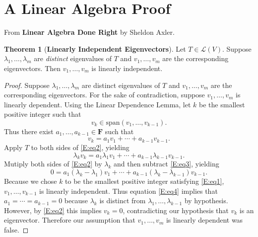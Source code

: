 \documentclass[12pt]{article}
\theoremstyle{definition}
\newtheorem{theorem}{Theorem}[section]
\begin{document}
\section{A Linear Algebra Proof}
From \textbf{Linear Algebra Done Right} by Sheldon Axler.
\begin{theorem}[\textbf{Linearly Independent Eigenvectors}]
Let $T \in \mathcal{L}(V)$.  Suppose $\lambda_{1},\ldots ,\lambda_{m}$ are \textit{distinct} eigenvalues of $T$ and $v_{1},\ldots ,v_{m}$ are the corresponding eigenvectors.  Then $v_{1},\ldots ,v_{m}$ is linearly independent.
\end{theorem}
\begin{proof}
Suppose $\lambda_{1},\ldots ,\lambda_{m}$ are distinct eigenvalues of $T$ and $v_{1},\ldots ,v_{m}$ are the corresponding eigenvectors.  For the sake of contradiction, suppose $v_{1},\ldots ,v_{m}$ is linearly dependent.  Using the Linear Dependence Lemma, let $k$ be the smallest positive integer such that 
\setcounter{equation}{0}%
\begin{equation}%
v_{k} \in \text{span}\left( v_{1},\ldots ,v_{k-1} \right).\label{E:eq1}%
\end{equation}
Thus there exist $a_{1},\ldots ,a_{k-1} \in \boldsymbol{F}$ such that
\begin{equation}
v_{k} = a_{1}v_{1}+ \cdots + a_{k-1}v_{k-1}. \label{E:eq2}%
\end{equation}
Apply $T$ to both sides of \eqref{E:eq2}, yielding
\begin{equation}
\lambda_{k}v_{k}= a_{1}\lambda_{1}v_{1}+ \cdots + a_{k-1}\lambda_{k-1}v_{k-1}.\label{E:eq3}
\end{equation}
Mutiply both sides of \eqref{E:eq2} by $\lambda_{k}$ and then subtract \eqref{E:eq3}, yielding
\begin{equation}
0=a_{1}\left( \lambda_{k}-\lambda_{1} \right)v_{1}+\cdots+a_{k-1} \left( \lambda_{k}-\lambda_{k-1} \right) v_{k-1}.\label{E:eq4}
\end{equation}
Because we chose $k$ to be the smallest positive integer satisfying \eqref{E:eq1}, $v_{1},\ldots ,v_{k-1}$ is linearly independent.  Thus equation \eqref{E:eq4} implies that
$a_{1}= \cdots =a_{k-1}=0$ because $\lambda_{k}$ is distinct from $\lambda_{1}, \dots,\lambda_{k-1}$ by hypothesis.  However, by \eqref{E:eq2} this implies $v_{k}=0$, contradicting our hypothesis that $v_{k}$ is an eigenvector.  Therefore our assumption that $v_{1},\ldots ,v_{m}$ is linearly dependent was false.
\end{proof}
\end{document}
